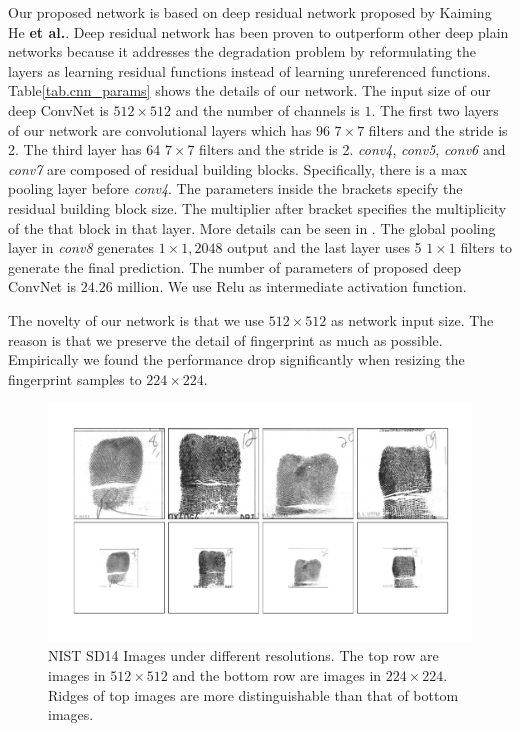Our proposed network is based on deep residual network proposed by Kaiming He \textbf{et al.}\cite{he2016deep}. Deep residual  network has been proven to outperform other deep plain networks because it addresses the degradation problem by reformulating the layers as learning residual functions instead of learning unreferenced functions. 
%
Table\ref{tab.cnn_params} shows the details of our network. The input size of our deep ConvNet is $512\times512$ and the number of channels is $1$.
The first two layers of our network are convolutional layers which has 96 $7\times7$ filters and the stride is 2. The third layer has 64 $7\times7$ filters and the stride is 2. 
%
\textit{conv4}, \textit{conv5}, \textit{conv6} and \textit{conv7} are composed of residual building blocks. Specifically, there is a max pooling layer before  \textit{conv4}. The parameters inside the brackets specify the residual building block size. 
%
The multiplier after bracket specifies the multiplicity of the that block in that layer. More details can be seen in \cite{he2016deep}. 
%
The global pooling layer in \textit{conv8} generates $1\times1,2048$ output and the last layer uses 5 $1\times1$ filters to generate the final prediction. 
%
The number of parameters of proposed deep ConvNet is $24.26$ million. 
%
We use Relu\cite{nair2010rectified} as intermediate activation function.
%

The novelty of our network is that we use $512\times512$ as network input size. The reason is that we preserve the detail of fingerprint as much as possible. Empirically we found the performance drop significantly when resizing the fingerprint samples to $224\times224$. 
%
\begin{figure}[!ht]
	\begin{center}
		\includegraphics[scale=0.28,clip=true,trim = 20mm 15mm 10mm 10mm]{fig/figs/resize_examples.pdf}
	\end{center}
	\caption{NIST SD14 Images under different resolutions. The top row are images in $512\times512$ and the bottom row are images in $224\times224$. Ridges of top images are more distinguishable than that of bottom images. } 
	\label{fig.resize_examples}
\end{figure}

